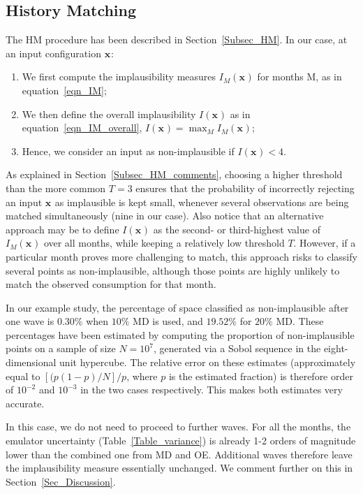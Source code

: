 \documentclass[preprint,12pt, sort&compress]{elsarticle}
\newcommand{\bd}[1]{\boldsymbol{#1}}
\newcommand{\x}[1][]{\bd{x_{#1}}}
\begin{document}

\subsection{History Matching}

The HM procedure has been described in Section~\ref{Subsec_HM}. In our case, at an input configuration $\x$:
\begin{enumerate}
\item We first compute the implausibility measures $I_M (\x)$ for months M, as in equation~\eqref{eqn_IM};
\item We then define the overall implausibility $I(\x)$ as in equation~\eqref{eqn_IM_overall}, $I(\x) = \max_M I_M(\x)$;
\item Hence, we consider an input as non-implausible if $I(\x) < 4$.
\end{enumerate}

As explained in Section~\ref{Subsec_HM_comments}, choosing a higher threshold than the more common $T=3$ ensures that the probability of incorrectly rejecting an input $\x$ as implausible is kept small, whenever several observations are being matched simultaneously (nine in our case). Also notice that an alternative approach may be to define $I(\x)$ as the second- or third-highest value of $I_M (\x)$ over all months, while keeping a relatively low threshold $T$. However, if a particular month proves more challenging to match, this approach risks to classify several points as non-implausible, although those points are highly unlikely to match the observed consumption for that month.

In our example study, the percentage of space classified as non-implausible after one wave is $0.30\%$ when $10\%$ MD is used, and $19.52\%$ for $20\%$ MD. These percentages have been estimated by computing the proportion of non-implausible points on a sample of size $N=10^7$, generated via a Sobol sequence in the eight-dimensional unit hypercube. The relative error on these estimates (approximately equal to $\left[(p(1-p)/N\right]/p$, where $p$ is the estimated fraction) is therefore order of $10^{-2}$ and $10^{-3}$ in the two cases respectively. This makes both estimates very accurate.


In this case, we do not need to proceed to further waves. For all the months, the emulator uncertainty (Table~\ref{Table_variance}) is already 1-2 orders of magnitude lower than the combined one from MD and OE. Additional waves therefore leave the implausibility measure essentially unchanged. We comment further on this in Section~\ref{Sec_Discussion}.
\end{document}
